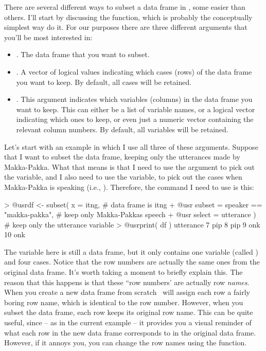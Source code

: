 There are several different ways to subset a data frame in \R, some easier than others. I'll start by discussing the  function, which is probably the conceptually simplest way do it. For our purposes there are three different arguments that you'll be most interested in:
\begin{itemize} \itemsep 0pt
\item {}. The data frame that you want to subset.
\item {}. A vector of logical values indicating which cases (rows) of the data frame you want to keep. By default, all cases will be retained.
\item {}. This argument indicates which variables (columns) in the data frame you want to keep. This can either be a list of variable names, or a logical vector indicating which ones to keep, or even just a numeric vector containing the relevant column numbers. By default, all variables will be retained.
\end{itemize}
Let's start with an example in which I use all three of these arguments. Suppose that I want to subset the  data frame, keeping only the utterances made by Makka-Pakka. What that means is that I need to use the  argument to pick out the  variable, and I also need to use the  variable, to pick out the cases when Makka-Pakka is speaking (i.e., ). Therefore, the command I need to use is this:
\begin{rblock1}
> @usr{df <- subset( x = itng,}                            # data frame is itng
+ @usr{              subset = speaker == "makka-pakka",}   # keep only Makka-Pakkas speech
+ @usr{              select = utterance )}                 # keep only the utterance variable
> @usr{print( df )}
   utterance
7        pip
8        pip
9        onk
10       onk
\end{rblock1}
The variable  here is still a data frame, but it only contains one variable (called ) and four cases. Notice that the row numbers are actually the same ones from the original data frame. It's worth taking a moment to briefly explain this. The reason that this happens is that these ``row numbers' are actually row {\it names}. When you create a new data frame from scratch \R\ will assign each row a fairly boring row name, which is identical to the row number. However, when you subset the data frame, each row keeps its original row name. This can be quite useful, since -- as in the current example -- it provides you a visual reminder of what each row in the new data frame corresponds to in the original data frame. However, if it annoys you, you can change the row names using the  function.

